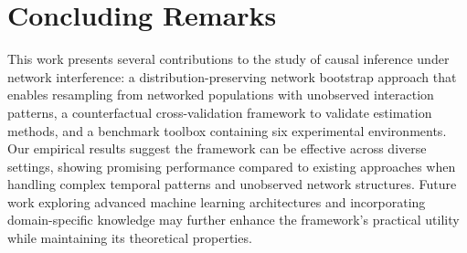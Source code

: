 \section{Concluding Remarks}
\label{sec:conclusion}
% 
This work presents several contributions to the study of causal inference under network interference: a distribution-preserving network bootstrap approach that enables resampling from networked populations with unobserved interaction patterns, a counterfactual cross-validation framework to validate estimation methods, and a benchmark toolbox containing six experimental environments. Our empirical results suggest the framework can be effective across diverse settings, showing promising performance compared to existing approaches when handling complex temporal patterns and unobserved network structures. Future work exploring advanced machine learning architectures and incorporating domain-specific knowledge may further enhance the framework's practical utility while maintaining its theoretical properties.